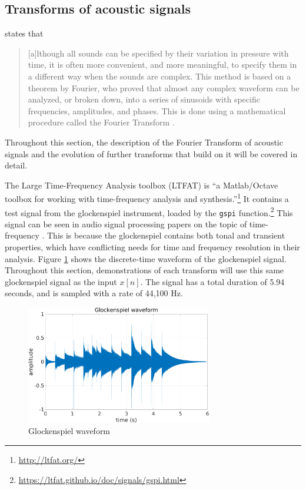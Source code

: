 \documentclass[report.tex]{subfiles}
\begin{document}
\subsection{Transforms of acoustic signals}
\label{sec:freqdomain}

\citeauthor{moore} states that

\begin{quote}
	[a]lthough all sounds can be specified by their variation in pressure with time, it is often more convenient, and more meaningful, to specify them in a different way when the sounds are complex. This method is based on a theorem by Fourier, who proved that almost any complex waveform can be analyzed, or broken down, into a series of sinusoids with specific frequencies, amplitudes, and phases. This is done using a mathematical procedure called the Fourier Transform \parencite[4]{moore}.
\end{quote}

Throughout this section, the description of the Fourier Transform of acoustic signals and the evolution of further transforms that build on it will be covered in detail.

The Large Time-Frequency Analysis toolbox (LTFAT) is ``a Matlab/Octave toolbox for working with time-frequency analysis and synthesis.''\footnote{\url{http://ltfat.org/}} It contains a test signal from the glockenspiel instrument, loaded by the \Verb#gspi# function.\footnote{\url{https://ltfat.github.io/doc/signals/gspi.html}} This signal can be seen in audio signal processing papers on the topic of time-frequency \parencite{doerflerphd, balazs, jaillet, tfjigsaw, invertiblecqt, wmdct}. This is because the glockenspiel contains both tonal and transient properties, which have conflicting needs for time and frequency resolution in their analysis. Figure \ref{fig:glockwaveform} shows the discrete-time waveform of the glockenspiel signal. Throughout this section, demonstrations of each transform will use this same glockenspiel signal as the input $x[n]$. The signal has a total duration of 5.94 seconds, and is sampled with a rate of 44,100 Hz.

\begin{figure}[ht]
	\centering
	\includegraphics[width=0.725\textwidth]{./images-gspi/glock_waveform.png}
	\caption{Glockenspiel waveform}
	\label{fig:glockwaveform}
\end{figure}
\end{document}
